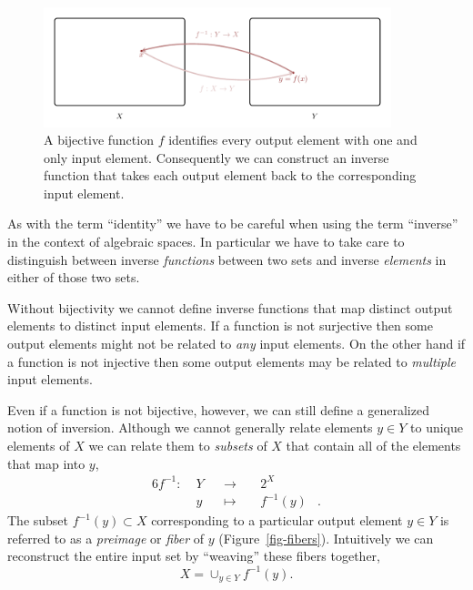\documentclass[
  letterpaper,
  DIV=11,
  numbers=noendperiod]{scrartcl}
\begin{document}
\begin{figure}

{\centering \includegraphics[width=0.9\textwidth,height=\textheight]{figures/maps/inverse/inverse.pdf}

}

\caption{\label{fig-function-inverse}A bijective function \(f\)
identifies every output element with one and only input element.
Consequently we can construct an inverse function that takes each output
element back to the corresponding input element.}

\end{figure}

As with the term ``identity'' we have to be careful when using the term
``inverse'' in the context of algebraic spaces. In particular we have to
take care to distinguish between inverse \emph{functions} between two
sets and inverse \emph{elements} in either of those two sets.

Without bijectivity we cannot define inverse functions that map distinct
output elements to distinct input elements. If a function is not
surjective then some output elements might not be related to \emph{any}
input elements. On the other hand if a function is not injective then
some output elements may be related to \emph{multiple} input elements.

Even if a function is not bijective, however, we can still define a
generalized notion of inversion. Although we cannot generally relate
elements \(y \in Y\) to unique elements of \(X\) we can relate them to
\emph{subsets} of \(X\) that contain all of the elements that map into
\(y\), \begin{alignat*}{6}
f^{-1} :\; & Y & &\rightarrow& \; & 2^X &
\\
& y & &\mapsto& & f^{-1}(y) &.
\end{alignat*} The subset \(f^{-1}(y) \subset X\) corresponding to a
particular output element \(y \in Y\) is referred to as a
\emph{preimage} or \emph{fiber} of \(y\) (Figure~\ref{fig-fibers}).
Intuitively we can reconstruct the entire input set by ``weaving'' these
fibers together, \[
X = \cup_{y \in Y} f^{-1}(y).
\]
\end{document}
